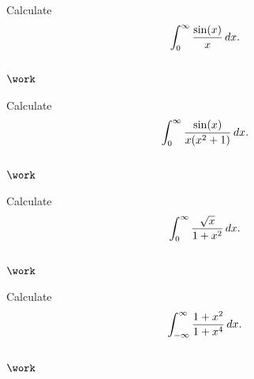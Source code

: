 \begin{problem}[?]

Calculate
\begin{align*}
\int_0^\infty {\sin(x) \over x}\, dx
.\end{align*}

\end{problem}

\hypertarget{work-54}{%
\subsection{\texorpdfstring{\(\work\)}{\textbackslash work}}\label{work-54}}

\begin{problem}[?]

Calculate
\begin{align*}
\int_0^\infty {\sin(x) \over x(x^2+1)}\, dx
.\end{align*}

\end{problem}

\hypertarget{work-55}{%
\subsection{\texorpdfstring{\(\work\)}{\textbackslash work}}\label{work-55}}

\begin{problem}[?]

Calculate
\begin{align*}
\int_0^\infty {\sqrt x \over 1 + x^2} \, dx
.\end{align*}

\end{problem}

\hypertarget{work-56}{%
\subsection{\texorpdfstring{\(\work\)}{\textbackslash work}}\label{work-56}}

\begin{problem}[?]

Calculate
\begin{align*}
\int_{-\infty}^\infty {1+x^2 \over 1+x^4}\, dx
.\end{align*}

\end{problem}

\hypertarget{work-57}{%
\subsection{\texorpdfstring{\(\work\)}{\textbackslash work}}\label{work-57}}

